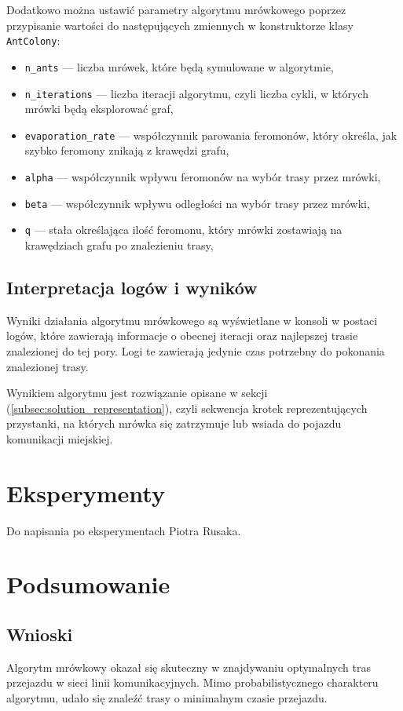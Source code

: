 \documentclass{article}
\begin{document}
Dodatkowo można ustawić parametry algorytmu mrówkowego poprzez przypisanie wartości do następujących zmiennych w konstruktorze klasy \texttt{AntColony}:
\begin{itemize}
    \item \texttt{n\_ants} --- liczba mrówek, które będą symulowane w algorytmie,
    \item \texttt{n\_iterations} --- liczba iteracji algorytmu, czyli liczba cykli, w których mrówki będą eksplorować graf,
    \item \texttt{evaporation\_rate} --- współczynnik parowania feromonów, który określa, jak szybko feromony znikają z krawędzi grafu,
    \item \texttt{alpha} --- współczynnik wpływu feromonów na wybór trasy przez mrówki,
    \item \texttt{beta} --- współczynnik wpływu odległości na wybór trasy przez mrówki,
    \item \texttt{q} --- stała określająca ilość feromonu, który mrówki zostawiają na krawędziach grafu po znalezieniu trasy,
\end{itemize}

\subsection{Interpretacja logów i wyników}
Wyniki działania algorytmu mrówkowego są wyświetlane w konsoli w postaci logów, które zawierają informacje o obecnej iteracji
oraz najlepszej trasie znalezionej do tej pory. Logi te zawierają jedynie czas potrzebny do pokonania znalezionej trasy.

Wynikiem algorytmu jest rozwiązanie opisane w sekcji (\ref{subsec:solution_representation}), czyli sekwencja krotek
reprezentujących przystanki, na których mrówka się zatrzymuje lub wsiada do pojazdu komunikacji miejskiej.

\section{Eksperymenty}
Do napisania po eksperymentach Piotra Rusaka.

\section{Podsumowanie}
\subsection{Wnioski}
Algorytm mrówkowy okazał się skuteczny w znajdywaniu optymalnych tras przejazdu w sieci linii komunikacyjnych.
Mimo probabilistycznego charakteru algorytmu, udało się znaleźć trasy o minimalnym czasie przejazdu.
\end{document}
